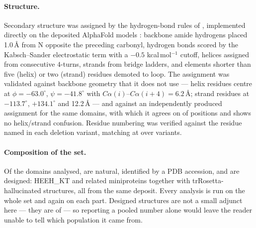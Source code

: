 \documentclass[11pt]{article}
\begin{document}
\paragraph{Structure.} Secondary structure was assigned by the hydrogen-bond rules of
\citet{kabsch1983}, implemented directly on the deposited AlphaFold models \citep{jumper2021}:
backbone amide hydrogens placed 1.0\,\AA{} from N opposite the preceding carbonyl, hydrogen bonds
scored by the Kabsch--Sander electrostatic term with a $-0.5$ kcal\,mol$^{-1}$ cutoff, helices
assigned from consecutive $4$-turns, strands from bridge ladders, and elements shorter than five
(helix) or two (strand) residues demoted to loop. The assignment was validated against backbone
geometry that it does not use --- helix residues centre at $\phi = -63.0^\circ$,
$\psi = -41.8^\circ$ with $C\alpha(i)$--$C\alpha(i{+}4) = 6.2$\,\AA{}; strand residues at
$-113.7^\circ$, $+134.1^\circ$ and 12.2\,\AA{} --- and against an independently produced
assignment for the same domains, with which it agrees on \SSagree{} of positions and shows no
helix/strand confusion. Residue numbering was verified against the residue named in each deletion
variant, matching at \NumberMatch{} over \NumberChecks{} variants.

\paragraph{Composition of the set.} Of the \Ndom{} domains analysed, \NNatDom{} are natural,
identified by a PDB accession, and \NDesDom{} are designed: HEEH\_KT and related miniproteins
\citep{rocklin2017} together with trRosetta-hallucinated structures, all from the same deposit.
Every analysis is run on the whole set and again on each part. Designed structures are not a
small adjunct here --- they are \NDesDom{} of \Ndom{} --- so reporting a pooled number alone
would leave the reader unable to tell which population it came from.
\end{document}
